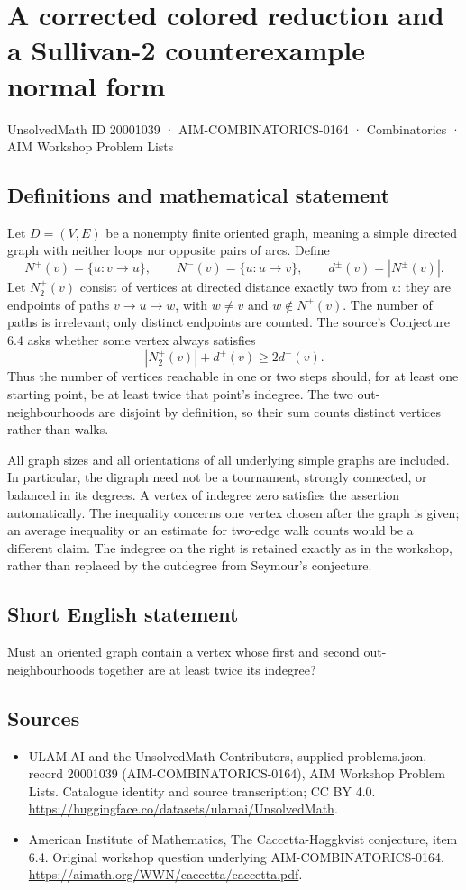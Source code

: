 \documentclass[11pt,a4paper]{article}
\begin{document}
\section*{A corrected colored reduction and a Sullivan-2 counterexample normal form}\label{20001039}
{\small UnsolvedMath ID 20001039 · AIM-COMBINATORICS-0164 · Combinatorics · AIM Workshop Problem Lists}
\subsection{Definitions and mathematical statement}
Let $D=(V,E)$ be a nonempty finite oriented graph, meaning a simple
directed graph with neither loops nor opposite pairs of arcs. Define
\[
 N^+(v)=\{u:v\to u\},\qquad N^-(v)=\{u:u\to v\},
 \qquad d^\pm(v)=|N^\pm(v)|.
\]
Let $N_2^+(v)$ consist of vertices at directed distance exactly two
from $v$: they are endpoints of paths $v\to u\to w$, with $w\ne v$
and $w\notin N^+(v)$. The number of paths is irrelevant; only distinct
endpoints are counted.
The source's Conjecture 6.4 asks whether some vertex always satisfies
\[
                        |N_2^+(v)|+d^+(v)\ge2d^-(v).
\]
Thus the number of vertices reachable in one or two steps should,
for at least one starting point, be at least twice that point's
indegree. The two out-neighbourhoods are disjoint by definition,
so their sum counts distinct vertices rather than walks.

All graph sizes and all orientations of all underlying simple graphs
are included. In particular, the digraph need not be a tournament,
strongly connected, or balanced in its degrees. A vertex of indegree
zero satisfies the assertion automatically. The inequality concerns
one vertex chosen after the graph is given; an average inequality or
an estimate for two-edge walk counts would be a different claim.
The indegree on the right is retained exactly as in the workshop,
rather than replaced by the outdegree from Seymour's conjecture.
\subsection{Short English statement}
Must an oriented graph contain a vertex whose first and second out-neighbourhoods together are at least twice its indegree?
\subsection{Sources}
\begin{itemize}
\item[S1] ULAM.AI and the UnsolvedMath Contributors, supplied problems.json, record 20001039 (AIM-COMBINATORICS-0164), AIM Workshop Problem Lists. Catalogue identity and source transcription; CC BY 4.0.
\url{https://huggingface.co/datasets/ulamai/UnsolvedMath}.
\item[S2] American Institute of Mathematics, The Caccetta-Haggkvist conjecture, item 6.4. Original workshop question underlying AIM-COMBINATORICS-0164.
\url{https://aimath.org/WWN/caccetta/caccetta.pdf}.
\end{itemize}
\end{document}
